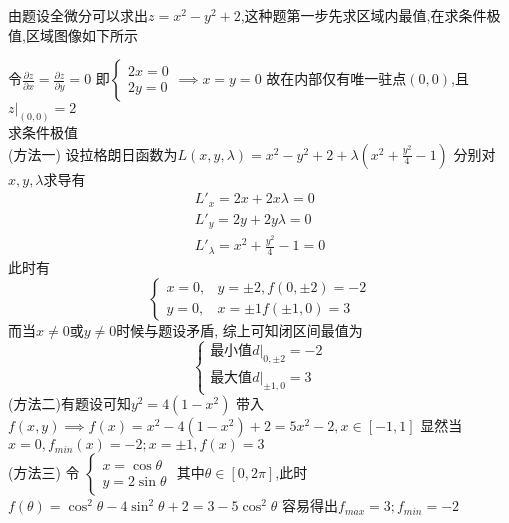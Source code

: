 \documentclass[12pt, a4paper, oneside, UTF8]{ctexbook}
\begin{document}
\begin{enumerate}[label=\arabic*.,start=12]
    \begin{solution}
    由题设全微分可以求出$z=x^2-y^2+2$,这种题第一步先求区域内最值,在求条件极值,区域图像如下所示
    \begin{center}
    \end{center}
    令$\frac{\partial z}{\partial x} =\frac{\partial z}{\partial y} = 0$ 即$\begin{cases}
        2x = 0\\
        2y = 0
    \end{cases} \implies x = y = 0$ 故在内部仅有唯一驻点$(0,0)$,且$z\big|_{(0,0)}=2$ \\
    求条件极值 \\
    (方法一) 设拉格朗日函数为$\displaystyle L(x,y,\lambda)=x^2-y^2+2+\lambda(x^2+\frac{y^2}{4}-1)$ 分别对$x,y,\lambda$求导有
    \begin{align}
        L'_x=2x+2x\lambda = 0\tag{1} \\
        L'_y=2y+2y\lambda = 0\tag{2} \\
        L'_\lambda = x^2+\frac{y^2}{4} - 1 = 0 
    \end{align}
    此时有
    $$
    \begin{cases}
        x = 0, & y =\pm 2, f(0, \pm 2) = -2 \\
        y = 0, & x = \pm 1 f(\pm 1, 0) = 3 
    \end{cases}
    $$
    而当$x\neq 0\text{或}y\neq 0$时候与题设矛盾, 综上可知闭区间最值为
    $$
    \begin{cases}
        \text{最小值} d\big|_{0,\pm 2} = -2 \\
        \text{最大值} d\big|_{\pm 1, 0} = 3
    \end{cases}
    $$
    (方法二)有题设可知$y^2=4(1-x^2)$ 带入$f(x,y)\implies f(x)=x^2-4(1-x^2)+2 = 
    5x^2 - 2,x\in\left[-1,1\right]$ 显然当$x=0,f_{min}(x)=-2;x=\pm 1,f(x)=3$ \\
    (方法三) 令
    $
    \begin{cases}
        x = \cos{\theta} \\
        y = 2\sin{\theta}
    \end{cases}
    $ 其中$\theta\in\left[0,2\pi\right]$,此时$f(\theta)=\cos^2{\theta}-4\sin^2{\theta}+2=3-5\cos^2{\theta}$
    容易得出$f_{max}= 3;f_{min}=-2$
\end{solution} 
\end{enumerate}

\ifx\allfiles\undefined
\end{document}
